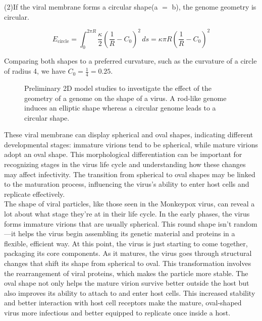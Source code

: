 \documentclass[12pt]{article}
\begin{document}
\begin{flushleft}
	(2)If the viral membrane forms a circular shape(a $=$ b), the genome geometry is circular.
	
\begin{equation}
E_{\text{circle}} = \int_0^{2\pi R} \frac{\kappa}{2} \left( \frac{1}{R} - C_0 \right)^2 \, ds = \kappa \pi R \left( \frac{1}{R} - C_0 \right)^2
\end{equation}

	
Comparing both shapes to a preferred curvature, such as the curvature of a circle of radius 4, we have
\( C_0 = \frac{1}{4} = 0.25 \).
 
	
\begin{figure}[!ht]
  \centering
  \caption{Preliminary 2D model studies to
investigate the effect of the geometry of a
genome on the shape of a virus. A rod-like
genome induces an elliptic shape whereas a
circular genome leads to a circular shape.}
\end{figure}
	

These viral membrane can display spherical and oval shapes, indicating different developmental stages: immature virions tend to be spherical, while mature virions adopt an oval shape. This morphological differentiation can be important for recognizing stages in the virus life cycle and understanding how these changes may affect infectivity. The transition from spherical to oval shapes may be linked to the maturation process, influencing the virus's ability to enter host cells and replicate effectively.\\

The shape of viral particles, like those seen in the Monkeypox virus, can reveal a lot about what stage they’re at in their life cycle. In the early phases, the virus forms immature virions that are usually spherical. This round shape isn’t random—it helps the virus begin assembling its genetic material and proteins in a flexible, efficient way. At this point, the virus is just starting to come together, packaging its core components. As it matures, the virus goes through structural changes that shift its shape from spherical to oval. This transformation involves the rearrangement of viral proteins, which makes the particle more stable. The oval shape not only helps the mature virion survive better outside the host but also improves its ability to attach to and enter host cells. This increased stability and better interaction with host cell receptors make the mature, oval-shaped virus more infectious and better equipped to replicate once inside a host.




\end{flushleft}
\end{document}

